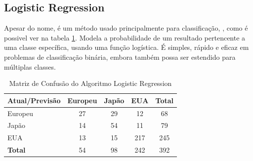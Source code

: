 \documentclass[conference]{IEEEtran}
\begin{document}
\subsection{Logistic Regression}
Apesar do nome, é um método usado principalmente para classificação, , como é possivel ver na tabela \ref{tab:conf_matrix_logistic}.
Modela a probabilidade de um resultado pertencente a uma classe específica, usando uma função logística. É simples, rápido e eficaz
em problemas de classificação binária, embora também possa ser estendido para múltiplas classes.
\begin{table}[!ht]
	\centering
	\begin{tabular}{lcccc}
		\toprule
		\textbf{Atual/Previsão} & \textbf{Europeu} & \textbf{Japão} & \textbf{EUA} & \textbf{Total} \\
		\midrule
		Europeu                 & 27               & 29             & 12           & 68             \\
		Japão                   & 14               & 54             & 11           & 79             \\
		EUA                     & 13               & 15             & 217          & 245            \\
		\midrule
		\textbf{Total}          & 54               & 98             & 242          & 392            \\
		\bottomrule
	\end{tabular}
	\label{tab:conf_matrix_logistic}
	\caption{Matriz de Confusão do Algoritmo Logistic Regression}
\end{table}

\end{document}
